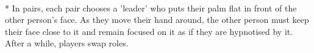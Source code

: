 \begin{minipage}{\textwidth}
\\*
In pairs, each pair chooses a 'leader' who puts their palm flat in front of the other person's face.  As they move their hand around, the other person must keep their face close to it and remain focused on it as if they are hypnotised by it.  After a while, players swap roles.
\end{minipage}    \vfill
